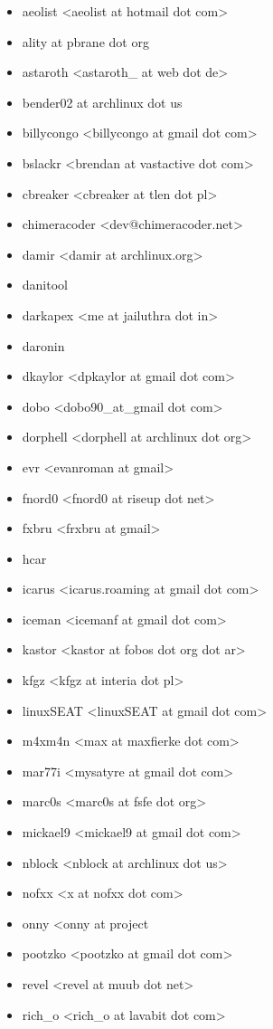 \begin{itemize}
\item  aeolist <aeolist at hotmail dot com>
\item  ality at pbrane dot org
\item  astaroth <astaroth\_ at web dot de>
\item  bender02 at archlinux dot us
\item  billycongo <billycongo at gmail dot com>
\item  bslackr <brendan at vastactive dot com>
\item  cbreaker <cbreaker at tlen dot pl>
\item  chimeracoder <dev@chimeracoder.net>
\item  damir <damir at archlinux.org>
\item  danitool
\item  darkapex <me at jailuthra dot in>
\item  daronin
\item  dkaylor <dpkaylor at gmail dot com>
\item  dobo <dobo90\_at\_gmail dot com>
\item  dorphell <dorphell at archlinux dot org>
\item  evr <evanroman  at  gmail>
\item  fnord0 <fnord0 at riseup dot net>
\item  fxbru <frxbru at gmail>
\item  hcar
\item  icarus <icarus.roaming at gmail dot com>
\item  iceman <icemanf at gmail dot com>
\item  kastor <kastor at fobos dot org dot ar>
\item  kfgz <kfgz at interia dot pl>
\item  linuxSEAT <linuxSEAT at gmail dot com>
\item  m4xm4n <max at maxfierke dot com>
\item  mar77i <mysatyre at gmail dot com>
\item  marc0s <marc0s at fsfe dot org>
\item  mickael9 <mickael9 at gmail dot com>
\item  nblock <nblock at archlinux dot us>
\item  nofxx <x at nofxx dot com>
\item  onny <onny at project
\item  pootzko <pootzko at gmail dot com>
\item  revel <revel at muub dot net>
\item  rich\_o <rich\_o at lavabit dot com>

\end{itemize}
